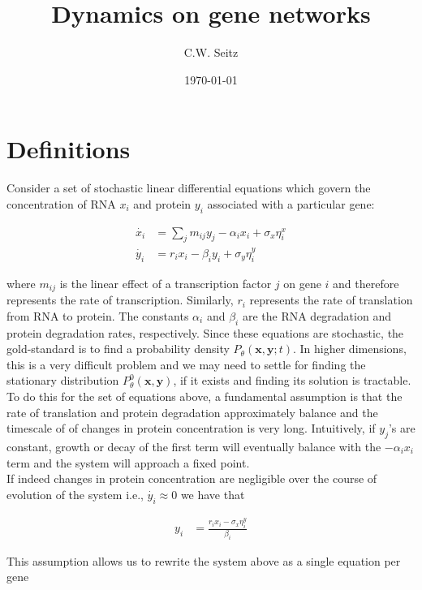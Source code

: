 \documentclass{article}
\title{Dynamics on gene networks}
\author{C.W. Seitz}
\date{\today}
\begin{document}
\maketitle

\section{Definitions}

Consider a set of stochastic linear differential equations which govern the concentration of RNA $x_{i}$ and protein $y_{i}$ associated with a particular gene:

\begin{align*}
\dot{x_{i}} &= \sum_{j}m_{ij}y_{j} - \alpha_{i} x_{i} + \sigma_{x}\eta_{i}^{x}\\
\dot{y_{i}} &= r_{i}x_{i} - \beta_{i}y_{i} + \sigma_{y}\eta_{i}^{y}
\end{align*}

where $m_{ij}$ is the linear effect of a transcription factor $j$ on gene $i$ and therefore represents the rate of transcription. Similarly, $r_{i}$ represents the rate of translation from RNA to protein. The constants $\alpha_{i}$ and $\beta_{i}$ are the RNA degradation and protein degradation rates, respectively. Since these equations are stochastic, the gold-standard is to find a probability density $P_{\theta}(\bm{x},\bm{y}; t)$. In higher dimensions, this is a very difficult problem and we may need to settle for finding the stationary distribution $P_{\theta}^{0}(\bm{x},\bm{y})$, if it exists and finding its solution is tractable. To do this for the set of equations above, a fundamental assumption is that the rate of translation and protein degradation approximately balance and the timescale of of changes in protein concentration is very long. Intuitively, if $y_{j}$'s are constant, growth or decay of the first term will eventually balance with the $-\alpha_{i}x_{i}$ term and the system will approach a fixed point.
\vspace{0.1in}
\\If indeed changes in protein concentration are negligible over the course of evolution of the system i.e., $\dot{y_{i}} \approx 0$ we have that

\begin{align*}
y_{i} &= \frac{r_{i}x_{i} - \sigma_{x}\eta_{i}^{y}}{\beta_{i}}
\end{align*}

This assumption allows us to rewrite the system above as a single equation per gene
\end{document}
